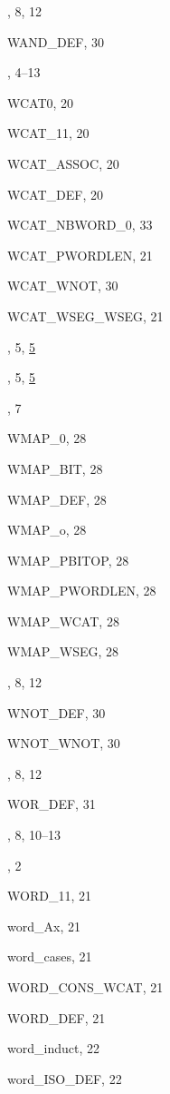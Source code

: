 \begin{theindex}
  \item {}, 8, 12
  \item {\ptt WAND\_DEF}, 30
  \item {}, 4--13
  \item {\ptt WCAT0}, 20
  \item {\ptt WCAT\_11}, 20
  \item {\ptt WCAT\_ASSOC}, 20
  \item {\ptt WCAT\_DEF}, 20
  \item {\ptt WCAT\_NBWORD\_0}, 33
  \item {\ptt WCAT\_PWORDLEN}, 21
  \item {\ptt WCAT\_WNOT}, 30
  \item {\ptt WCAT\_WSEG\_WSEG}, 21
  \item {}, 5, \ul{5}
  \item {}, 5, \ul{5}
  \item {}, 7
  \item {\ptt WMAP\_0}, 28
  \item {\ptt WMAP\_BIT}, 28
  \item {\ptt WMAP\_DEF}, 28
  \item {\ptt WMAP\_o}, 28
  \item {\ptt WMAP\_PBITOP}, 28
  \item {\ptt WMAP\_PWORDLEN}, 28
  \item {\ptt WMAP\_WCAT}, 28
  \item {\ptt WMAP\_WSEG}, 28
  \item {}, 8, 12
  \item {\ptt WNOT\_DEF}, 30
  \item {\ptt WNOT\_WNOT}, 30
  \item {}, 8, 12
  \item {\ptt WOR\_DEF}, 31
  \item {}, 8, 10--13
  \item {}, 2
  \item {\ptt WORD\_11}, 21
  \item {\ptt word\_Ax}, 21
  \item {\ptt word\_cases}, 21
  \item {\ptt WORD\_CONS\_WCAT}, 21
  \item {\ptt WORD\_DEF}, 21
  \item {\ptt word\_induct}, 22
  \item {\ptt word\_ISO\_DEF}, 22

\end{theindex}
